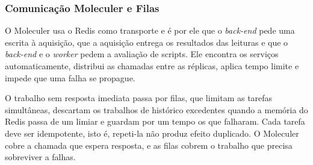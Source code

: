 \subsubsection{Comunicação Moleculer e Filas}

\par O Moleculer usa o Redis como transporte \cite{MOLECULER_DOCS} e é por ele que o \emph{back-end} pede uma escrita à aquisição, que a aquisição entrega os resultados das leituras e que o \emph{back-end} e o \emph{worker} pedem a avaliação de scripts. Ele encontra os serviços automaticamente, distribui as chamadas entre as réplicas, aplica tempo limite e impede que uma falha se propague.

\par O trabalho sem resposta imediata passa por filas, que limitam as tarefas simultâneas, descartam os trabalhos de histórico excedentes quando a memória do Redis passa de um limiar e guardam por um tempo os que falharam. Cada tarefa deve ser idempotente, isto é, repeti-la não produz efeito duplicado. O Moleculer cobre a chamada que espera resposta, e as filas cobrem o trabalho que precisa sobreviver a falhas.
